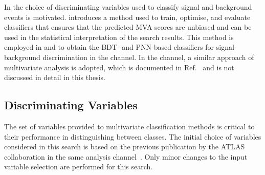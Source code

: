 In  the choice of discriminating
variables used to classify signal and background events is
motivated.  introduces a method used to train,
optimise, and evaluate classifiers that ensures that the predicted MVA scores
are unbiased and can be used in the statistical interpretation of the search
results. This method is employed in  and 
to obtain the BDT- and PNN-based classifiers for signal-background
discrimination in the \hadhad channel. In the \lephad channel, a similar
approach of multivariate analysis is adopted, which is documented in
Ref.~\cite{HDBS-2018-40} and is not discussed in detail in this thesis.


\subsection{Discriminating Variables}%
\label{sec:mva_discriminating variables}

The set of variables provided to multivariate classification methods is critical
to their performance in distinguishing between classes. The initial choice of
variables considered in this search is based on the previous publication by the
ATLAS collaboration in the same analysis
channel~\cite{HIGG-2016-16-witherratum}. Only minor changes to the input
variable selection are performed for this search.

